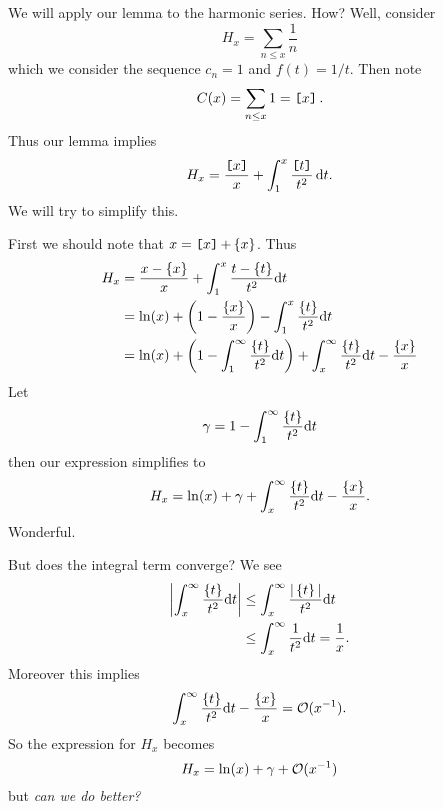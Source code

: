 We will apply our lemma to the harmonic series. How? Well, consider
\begin{equation}
H_{x}=\sum_{n\leq x}\frac{1}{n}
\end{equation}
which we consider the sequence $c_{n}=1$ and $f(t)=1/t$. Then note
\begin{equation}
C(x)=\sum_{n\leq x}1=\mathop{\texttt{[}}\nolimits\!x\!\mathop{\texttt{]}}\nolimits.
\end{equation}
Thus our lemma implies
\begin{equation}
H_{x} = \frac{\mathop{\texttt{[}}\nolimits\!x\!\mathop{\texttt{]}}\nolimits}{x}+\int^{x}_{1}\frac{\mathop{\texttt{[}}\nolimits\!t\!\mathop{\texttt{]}}\nolimits}{t^{2}}\,\mathrm{d}
t.
\end{equation}
We will try to simplify this.

First we should note that $x=\mathop{\texttt{[}}\nolimits\!x\!\mathop{\texttt{]}}\nolimits+\mathop{\{}\nolimits\!x\!\mathop{\}}\nolimits$. Thus
\begin{subequations}
\begin{align}
H_{x}&=\frac{x-\fracPart{x}}{x}+\int^{x}_{1}\frac{t-\fracPart{t}}{t^{2}}\D
t\\
&=\ln(x)+\left(1-\frac{\fracPart{x}}{x}\right)-\int^{x}_{1}\frac{\fracPart{t}}{t^{2}}\D t\\
&=\ln(x)+\left(1-\int^{\infty}_{1}\frac{\fracPart{t}}{t^{2}}\D t\right)
+\int^{\infty}_{x}\frac{\fracPart{t}}{t^{2}}\D t-\frac{\fracPart{x}}{x}
\end{align}
\end{subequations}
Let
\begin{equation}
\gamma=1-\int^{\infty}_{1}\frac{\mathop{\{}\nolimits\!t\!\mathop{\}}\nolimits}{t^{2}}\mathrm{d} t
\end{equation}
then our expression simplifies to
\begin{equation}
H_{x} = \ln(x)+\gamma+\int^{\infty}_{x}\frac{\mathop{\{}\nolimits\!t\!\mathop{\}}\nolimits}{t^{2}}\mathrm{d}
t-\frac{\mathop{\{}\nolimits\!x\!\mathop{\}}\nolimits}{x}.
\end{equation}
Wonderful.

But does the integral term converge? We see
\begin{subequations}
\begin{align}
\left|\int^{\infty}_{x}\frac{\mathop{\{}\nolimits\!t\!\mathop{\}}\nolimits}{t^{2}}\mathrm{d} t\right|
&\leq\int^{\infty}_{x}\frac{|\mathop{\{}\nolimits\!t\!\mathop{\}}\nolimits|}{t^{2}}\mathrm{d} t\\
&\leq\int^{\infty}_{x}\frac{1}{t^{2}}\mathrm{d} t = \frac{1}{x}.
\end{align}
\end{subequations}
Moreover this implies
\begin{equation}
\int^{\infty}_{x}\frac{\mathop{\{}\nolimits\!t\!\mathop{\}}\nolimits}{t^{2}}\mathrm{d}
t-\frac{\mathop{\{}\nolimits\!x\!\mathop{\}}\nolimits}{x}=\mathcal{O}(x^{-1}).
\end{equation}
So the expression for $H_{x}$ becomes
\begin{equation}
H_{x}=\ln(x)+\gamma+\mathcal{O}(x^{-1})
\end{equation}
but \emph{can we do better?}

